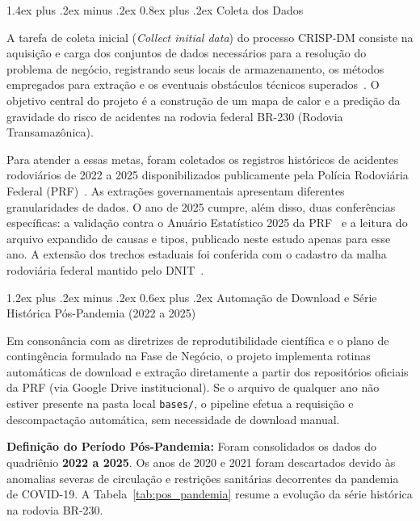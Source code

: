 \documentclass[11pt,a4paper]{article}
\makeatletter
\renewcommand\section{
\@startsection{section}{1}{0pt}%
{1.4ex plus .2ex minus .2ex}%
{0.8ex plus .2ex}%
{\normalfont\Large\bfseries\color{primary}}
}
\renewcommand\subsection{
\@startsection{subsection}{2}{0pt}%
{1.2ex plus .2ex minus .2ex}%
{0.6ex plus .2ex}%
{\normalfont\large\bfseries\color{secondary}}
}
\makeatother
\begin{document}
\newpage

\section{Coleta dos Dados}

A tarefa de coleta inicial (\textit{Collect initial data}) do processo CRISP-DM consiste na aquisição e carga dos conjuntos de dados necessários para a resolução do problema de negócio, registrando seus locais de armazenamento, os métodos empregados para extração e os eventuais obstáculos técnicos superados~\cite{chapman2000}. O objetivo central do projeto é a construção de um mapa de calor e a predição da gravidade do risco de acidentes na rodovia federal BR-230 (Rodovia Transamazônica).

Para atender a essas metas, foram coletados os registros históricos de acidentes rodoviários de 2022 a 2025 disponibilizados publicamente pela Polícia Rodoviária Federal (PRF)~\cite{prfdados}. As extrações governamentais apresentam diferentes granularidades de dados. O ano de 2025 cumpre, além disso, duas conferências específicas: a validação contra o Anuário Estatístico 2025 da PRF~\cite{prfanuario2025} e a leitura do arquivo expandido de causas e tipos, publicado neste estudo apenas para esse ano. A extensão dos trechos estaduais foi conferida com o cadastro da malha rodoviária federal mantido pelo DNIT~\cite{dnit2026}.

\subsection{Automação de Download e Série Histórica Pós-Pandemia (2022 a 2025)}

Em consonância com as diretrizes de reprodutibilidade científica e o plano de contingência formulado na Fase de Negócio, o projeto implementa rotinas automáticas de download e extração diretamente a partir dos repositórios oficiais da PRF (via Google Drive institucional). Se o arquivo de qualquer ano não estiver presente na pasta local \texttt{bases/}, o pipeline efetua a requisição e descompactação automática, sem necessidade de download manual.

\textbf{Definição do Período Pós-Pandemia:} Foram consolidados os dados do quadriênio \textbf{2022 a 2025}. Os anos de 2020 e 2021 foram descartados devido às anomalias severas de circulação e restrições sanitárias decorrentes da pandemia de COVID-19. A Tabela~\ref{tab:pos_pandemia} resume a evolução da série histórica na rodovia BR-230.
\end{document}
